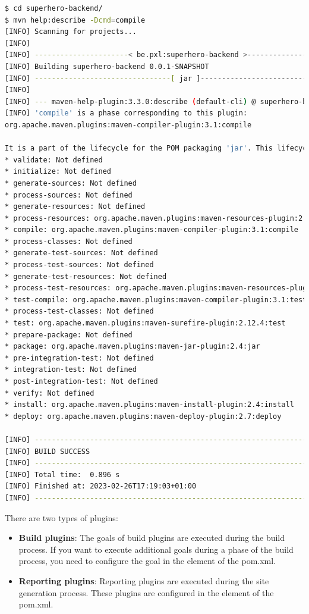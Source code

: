 \begin{lstlisting}[language=bash, frame=single]
$ cd superhero-backend/
$ mvn help:describe -Dcmd=compile
[INFO] Scanning for projects...
[INFO] 
[INFO] ----------------------< be.pxl:superhero-backend >----------------------
[INFO] Building superhero-backend 0.0.1-SNAPSHOT
[INFO] --------------------------------[ jar ]---------------------------------
[INFO]
[INFO] --- maven-help-plugin:3.3.0:describe (default-cli) @ superhero-backend ---
[INFO] 'compile' is a phase corresponding to this plugin:
org.apache.maven.plugins:maven-compiler-plugin:3.1:compile

It is a part of the lifecycle for the POM packaging 'jar'. This lifecycle includes the following phases:
* validate: Not defined
* initialize: Not defined
* generate-sources: Not defined
* process-sources: Not defined
* generate-resources: Not defined
* process-resources: org.apache.maven.plugins:maven-resources-plugin:2.6:resources
* compile: org.apache.maven.plugins:maven-compiler-plugin:3.1:compile
* process-classes: Not defined
* generate-test-sources: Not defined
* process-test-sources: Not defined
* generate-test-resources: Not defined
* process-test-resources: org.apache.maven.plugins:maven-resources-plugin:2.6:testResources
* test-compile: org.apache.maven.plugins:maven-compiler-plugin:3.1:testCompile
* process-test-classes: Not defined
* test: org.apache.maven.plugins:maven-surefire-plugin:2.12.4:test
* prepare-package: Not defined
* package: org.apache.maven.plugins:maven-jar-plugin:2.4:jar
* pre-integration-test: Not defined
* integration-test: Not defined
* post-integration-test: Not defined
* verify: Not defined
* install: org.apache.maven.plugins:maven-install-plugin:2.4:install
* deploy: org.apache.maven.plugins:maven-deploy-plugin:2.7:deploy

[INFO] ------------------------------------------------------------------------
[INFO] BUILD SUCCESS
[INFO] ------------------------------------------------------------------------
[INFO] Total time:  0.896 s
[INFO] Finished at: 2023-02-26T17:19:03+01:00
[INFO] ------------------------------------------------------------------------
\end{lstlisting}


There are two types of plugins:
\begin{itemize}
\item \textbf{Build plugins}: The goals of build plugins are executed during the build process.  If you want to execute additional goals during a phase of the build process, you need to configure the goal in the  element of the pom.xml.
\item \textbf{Reporting plugins}: Reporting plugins are executed during the site generation process. These plugins are configured in the  element of the pom.xml.
\end{itemize}


